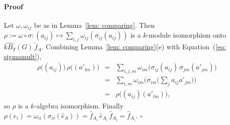 \documentclass[12pt]{article}
\theoremstyle{change}
\newenvironment{proof}{\paragraph{Proof}}{\hfill$\square$}
\newcommand{\1}{{\bf 1}}
\begin{document}
\begin{proof}
Let $\omega,\omega_{ij}$ be as in Lemma~\ref{lem: comparing}. Then
$\rho:=\omega\circ\sigma:(a_{ij})\mapsto\sum_{i,j}\omega_{ij}(\sigma_{ij}(a_{ij}))$ is a $k$-module isomorphism
onto $\widehat{kB_T}(G)\,\widetilde{f}_A$. Combining Lemma~\ref{lem: comparing}(e) with Equation~(\ref{eq: sigmamult}),
\begin{eqnarray*}
  \rho\big((a_{ij})\big)\,\rho\big((a'_{lm})\big)
  &=&\sum_{i,j,m}\omega_{im}\!\big(\sigma_{ij}(a_{ij})\,\sigma_{jm}(a'_{jm})\big)\\
  &=&\sum_{i,m}\omega_{im}\!\Big(\sigma_{im}\big(\textstyle\sum_j a_{ij}a'_{jm}\big)\Big)\\
  &=&\rho\big((a_{ij})(a'_{lm})\big),
\end{eqnarray*}
so $\rho$ is a $k$-algebra isomorphism. Finally
$\rho(e_i)=\omega_{ii}(\sigma_{ii}(\widehat{e}_A))=\widehat{f}_{A_i}\,\widehat{e}_{A_i}\,\widehat{f}_{A_i}=\widehat{f}_{A_i}$.
\end{proof}
\end{document}
